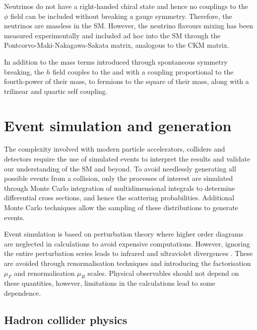 Neutrinos do not have a right-handed chiral state and hence no couplings to
the $\phi$ field can be included without breaking a gauge symmetry. Therefore,
the neutrinos are massless in the SM. However, the neutrino flavours mixing
has been measured experimentally and included ad hoc into the SM through the
Pontcorvo-Maki-Nakagawa-Sakata matrix\cite{Pontecorvo:1957qd,Maki:1962mu},
analogous to the CKM matrix.

In addition to the mass terms introduced through spontaneous symmetry breaking, the $h$ field couples to the \PW and \PZ with a coupling proportional to the fourth-power of their mass, to fermions to the square of their mass, along with a trilinear and quartic self coupling.


\section{Event simulation and generation}

The complexity involved with modern particle accelerators, colliders and detectors require the use of simulated events to interpret the results and validate our understanding of the SM and beyond. To avoid needlessly generating all possible events from a collision, only the processes of interest are simulated through Monte Carlo integration of multidimensional integrals to determine differential cross sections, and hence the scattering probabilities. Additional Monte Carlo techniques allow the sampling of these distributions to generate events.

Event simulation is based on perturbation theory where higher order diagrams are neglected in calculations to avoid expensive computations. However, ignoring the entire perturbation series leads to infrared and ultraviolet divergences \cite{Ellis:1991qj}. These are avoided through renormalisation techniques and introducing the factorisation $\mu_F$ and renormalisation $\mu_R$ scales. Physical observables should not depend on these quantities, however, limitations in the calculations lead to some dependence.


\subsection{Hadron collider physics}\label{sec:hadron-collider-physics}

